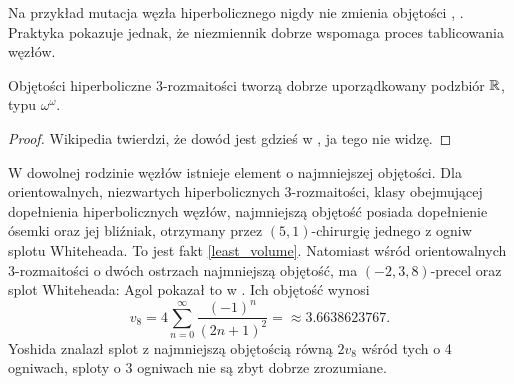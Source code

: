 Na przykład mutacja węzła hiperbolicznego nigdy nie zmienia objętości \cite{ruberman87}, \cite[s. 124]{adams94}.
Praktyka pokazuje jednak, że niezmiennik dobrze wspomaga proces tablicowania węzłów.

\begin{proposition}
    Objętości hiperboliczne 3-rozmaitości tworzą dobrze uporządkowany podzbiór $\mathbb R$, typu $\omega^\omega$.
\end{proposition}

\begin{proof}
    Wikipedia twierdzi, że dowód jest gdzieś w \cite{neumann85}, ja tego nie widzę.
\end{proof}

W dowolnej rodzinie węzłów istnieje element o najmniejszej objętości.
Dla orientowalnych, niezwartych hiperbolicznych 3-rozmaitości, klasy obejmującej dopełnienia hiperbolicznych węzłów, najmniejszą objętość posiada dopełnienie ósemki oraz jej bliźniak, otrzymany przez $(5, 1)$-chirurgię jednego z ogniw splotu Whiteheada.
To jest fakt \ref{least_volume}.
Natomiast wśród orientowalnych 3-rozmaitości o dwóch ostrzach najmniejszą objętość, ma $(-2, 3, 8)$-precel oraz splot Whiteheada: Agol pokazał to w \cite{agol10}.
Ich objętość wynosi
\begin{equation}
    v_8 = 4 \sum_{n=0}^\infty \frac{(-1)^n}{(2n+1)^2} = \approx 3.6638623767. %
\end{equation}
Yoshida \cite{yoshida13} znalazł splot z najmniejszą objętością równą $2v_8$ wśród tych o 4 ogniwach, sploty o 3 ogniwach nie są zbyt dobrze zrozumiane.

